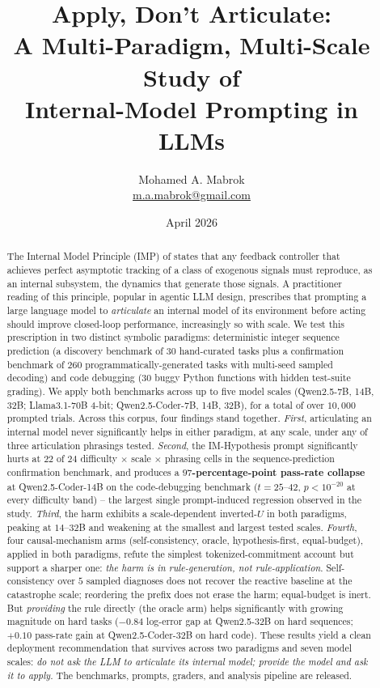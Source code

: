 \documentclass[11pt]{article}
\title{Apply, Don't Articulate:\\
A Multi-Paradigm, Multi-Scale Study of\\
Internal-Model Prompting in LLMs}
\author{Mohamed A. Mabrok\\
\href{mailto:m.a.mabrok@gmail.com}{m.a.mabrok@gmail.com}}
\date{April 2026}
\begin{document}
\maketitle

\begin{abstract}
The Internal Model Principle (IMP) of \citet{francis1976internal}
states that any feedback controller that achieves perfect
asymptotic tracking of a class of exogenous signals must reproduce,
as an internal subsystem, the dynamics that generate those
signals.  A practitioner reading of this principle, popular in
agentic LLM design, prescribes that prompting a large language
model to \emph{articulate} an internal model of its environment
before acting should improve closed-loop performance, increasingly
so with scale.  We test this prescription in two distinct symbolic
paradigms: deterministic integer sequence prediction (a discovery
benchmark of $30$ hand-curated tasks plus a confirmation benchmark
of $260$ programmatically-generated tasks with multi-seed sampled
decoding) and code debugging ($30$ buggy Python functions with
hidden test-suite grading).  We apply both benchmarks across up to
five model scales (Qwen2.5-7B, 14B, 32B; Llama3.1-70B 4-bit;
Qwen2.5-Coder-7B, 14B, 32B), for a total of over $10{,}000$
prompted trials.  Across this corpus, four findings stand
together.  \emph{First}, articulating an internal model never
significantly helps in either paradigm, at any scale, under any
of three articulation phrasings tested.  \emph{Second}, the
IM-Hypothesis prompt significantly hurts at $22$ of $24$
difficulty $\times$ scale $\times$ phrasing cells in the
sequence-prediction confirmation benchmark, and produces a
\textbf{$97$-percentage-point pass-rate collapse} at Qwen2.5-Coder-14B
on the code-debugging benchmark ($t = 25$--$42$, $p < 10^{-20}$
at every difficulty band) -- the largest single prompt-induced
regression observed in the study.  \emph{Third}, the harm
exhibits a scale-dependent inverted-$U$ in both paradigms,
peaking at $14$--$32$B and weakening at the smallest and largest
tested scales.  \emph{Fourth}, four causal-mechanism arms
(self-consistency, oracle, hypothesis-first, equal-budget),
applied in both paradigms, refute the simplest tokenized-commitment
account but support a sharper one: \emph{the harm is in
rule-generation, not rule-application}.  Self-consistency over
$5$ sampled diagnoses does not recover the reactive baseline at
the catastrophe scale; reordering the prefix does not erase the
harm; equal-budget is inert.  But \emph{providing} the rule
directly (the oracle arm) helps significantly with growing
magnitude on hard tasks ($-0.84$ log-error gap at Qwen2.5-32B
on hard sequences; $+0.10$ pass-rate gain at Qwen2.5-Coder-32B on
hard code).  These results yield a clean deployment recommendation
that survives across two paradigms and seven model scales:
\emph{do not ask the LLM to articulate its internal model;
provide the model and ask it to apply.}  The benchmarks, prompts,
graders, and analysis pipeline are released.


\end{abstract}
\end{document}
